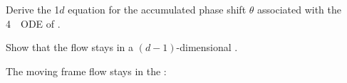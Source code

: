 {\label{exer:csectionPhase}
Derive the 1$d$ equation for the accumulated phase shift
$\theta$ associated with the 4\dmn\ \reducedsp\ ODE of
.
    } %


{\label{exer:csectionReduced}
Show that the flow  stays in a
$(d\!-\!1)$-dimensional \slice.
    } %

{The moving frame flow stays in the \reducedsp:}
{
    } %


